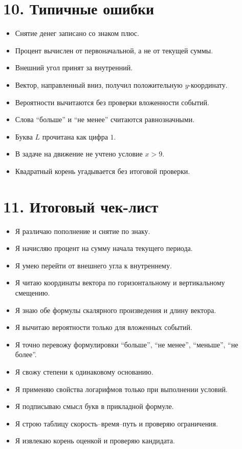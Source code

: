 \documentclass[a4paper,12pt]{article}
\begin{document}
\section*{10. Типичные ошибки}
\begin{warnbox}
\begin{itemize}
\item Снятие денег записано со знаком плюс.
\item Процент вычислен от первоначальной, а не от текущей суммы.
\item Внешний угол принят за внутренний.
\item Вектор, направленный вниз, получил положительную $y$-координату.
\item Вероятности вычитаются без проверки вложенности событий.
\item Слова ``больше'' и ``не менее'' считаются равнозначными.
\item Буква $L$ прочитана как цифра $1$.
\item В задаче на движение не учтено условие $x>9$.
\item Квадратный корень угадывается без итоговой проверки.
\end{itemize}
\end{warnbox}

\section*{11. Итоговый чек-лист}
\begin{itemize}[label=$\square$]
\item Я различаю пополнение и снятие по знаку.
\item Я начисляю процент на сумму начала текущего периода.
\item Я умею перейти от внешнего угла к внутреннему.
\item Я читаю координаты вектора по горизонтальному и вертикальному смещению.
\item Я знаю обе формулы скалярного произведения и длину вектора.
\item Я вычитаю вероятности только для вложенных событий.
\item Я точно перевожу формулировки ``больше'', ``не менее'', ``меньше'', ``не более''.
\item Я свожу степени к одинаковому основанию.
\item Я применяю свойства логарифмов только при выполнении условий.
\item Я подписываю смысл букв в прикладной формуле.
\item Я строю таблицу скорость--время--путь и проверяю ограничения.
\item Я извлекаю корень оценкой и проверяю кандидата.
\end{itemize}
\end{document}
